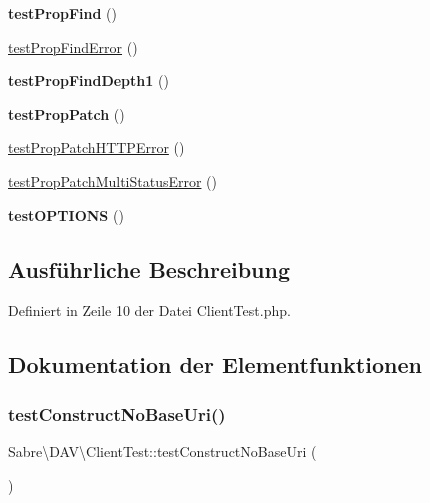 \begin{DoxyCompactItemize}
{\bfseries test\+Prop\+Find} ()
\item 
\mbox{\hyperlink{class_sabre_1_1_d_a_v_1_1_client_test_aa8d35b6e3895822be1e1fc60bf0b1d0a}{test\+Prop\+Find\+Error}} ()
\item 
\mbox{\label{class_sabre_1_1_d_a_v_1_1_client_test_a81da94f86ea46239d08c1547b98da9e1}} 
{\bfseries test\+Prop\+Find\+Depth1} ()
\item 
\mbox{\label{class_sabre_1_1_d_a_v_1_1_client_test_a84580a77253452013302fb2e9597a613}} 
{\bfseries test\+Prop\+Patch} ()
\item 
\mbox{\hyperlink{class_sabre_1_1_d_a_v_1_1_client_test_a28d1e13ad3a02bab92ea0ed407c18600}{test\+Prop\+Patch\+H\+T\+T\+P\+Error}} ()
\item 
\mbox{\hyperlink{class_sabre_1_1_d_a_v_1_1_client_test_a14ffebda721eef98f4771836592624c8}{test\+Prop\+Patch\+Multi\+Status\+Error}} ()
\item 
\mbox{\label{class_sabre_1_1_d_a_v_1_1_client_test_a28030187e34ebc0593175c2306bb061e}} 
{\bfseries test\+O\+P\+T\+I\+O\+NS} ()
\end{DoxyCompactItemize}


\subsection{Ausführliche Beschreibung}


Definiert in Zeile 10 der Datei Client\+Test.\+php.



\subsection{Dokumentation der Elementfunktionen}
\mbox{\label{class_sabre_1_1_d_a_v_1_1_client_test_aa23caefe1e976d7e2a82607afa3f84da}} 
\subsubsection{\texorpdfstring{test\+Construct\+No\+Base\+Uri()}{testConstructNoBaseUri()}}
{\footnotesize\ttfamily Sabre\textbackslash{}\+D\+A\+V\textbackslash{}\+Client\+Test\+::test\+Construct\+No\+Base\+Uri (\begin{DoxyParamCaption}{ }\end{DoxyParamCaption})}

